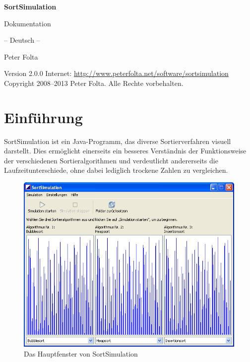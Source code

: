 \documentclass[11pt, a4paper, titlepage, oneside]{article}
\newcommand{\copyrightNotice}{Copyright \textcopyright{} 2008--2013 Peter Folta. Alle Rechte vorbehalten.}
\newcommand{\URL}{\href{http://www.peterfolta.net/software/sortsimulation}{http://www.peterfolta.net/software/sortsimulation}}
\newcommand{\version}{2.0.0}
\begin{document}
	
	\begin{titlepage}
		\begin{center}
			\vspace*{2.5cm}
			\Huge{\textbf{SortSimulation}}
			
			\vspace*{1.5cm}
			\LARGE{Dokumentation}
			
			\Large{-- Deutsch --}
			
			\vspace*{3.75cm}
			\Large{Peter Folta}
		\end{center}
		
		\vspace*{8cm}
		\noindent{}Version \version\newline{}
		Internet: \URL\newline{}
		\copyrightNotice
	\end{titlepage}
	
	\setcounter{page}{2}
	
	\cleardoublepage{}
	\tableofcontents{}
	\newpage{}
	
	
	\section{Einführung}
	
	SortSimulation ist ein Java-Programm, das diverse Sortierverfahren visuell darstellt. Dies ermöglicht einerseits ein besseres Verständnis der Funktionsweise der verschiedenen Sortieralgorithmen und verdeutlicht andererseits die Laufzeitunterschiede, ohne dabei lediglich trockene Zahlen zu vergleichen.
	
	\begin{figure}[h]
		\centering
		\includegraphics[scale=0.6]{images/image0.png}
		\caption{Das Hauptfenster von SortSimulation}
	\end{figure}
	
\end{document}
